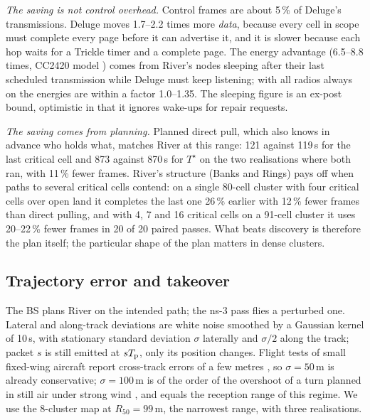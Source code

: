 \emph{The saving is not control overhead.} Control frames are about 5\,\% of Deluge's transmissions. Deluge moves
1.7--2.2 times more \emph{data}, because every cell in scope must complete every page before it can advertise it, and it
is slower because each hop waits for a Trickle timer and a complete page. The energy advantage (6.5--8.8 times, CC2420
model ) comes from River's nodes sleeping after their last scheduled transmission while Deluge
must keep listening; with all radios always on the energies are within a factor 1.0--1.35. The sleeping figure is an
ex-post bound, optimistic in that it ignores wake-ups for repair requests.

\emph{The saving comes from planning.} Planned direct pull, which also knows in advance who holds what, matches River at
this range: 121 against 119\,s for the last critical cell and 873 against 870\,s for $T^\star$ on the two realisations
where both ran, with 11\,\% fewer frames. River's structure (Banks and Rings) pays off when paths to several critical
cells contend: on a single 80-cell cluster with four critical cells over open land it completes the last one 26\,\%
earlier with 12\,\% fewer frames than direct pulling, and with 4, 7 and 16 critical cells on a 91-cell cluster it uses
20--22\,\% fewer frames in 20 of 20 paired passes. What beats discovery is therefore the plan itself; the particular
shape of the plan matters in dense clusters.

\subsection{Trajectory error and takeover}\label{sec:wind}
The BS plans River on the intended path; the ns-3 pass flies a perturbed one. Lateral and along-track deviations are
white noise smoothed by a Gaussian kernel of 10\,s, with stationary standard deviation $\sigma$ laterally and $\sigma/2$
along the track; packet $s$ is still emitted at $sT_{\mathrm p}$, only its position changes. Flight tests of small fixed-wing
aircraft report cross-track errors of a few metres \cite{park2007,nelson2007}, so $\sigma=50$\,m is already
conservative; $\sigma=100$\,m is of the order of the overshoot of a turn planned in still air under strong wind
\cite{techy2009}, and equals the reception range of this regime. We use the 8-cluster map at $R_{50}=99$\,m, the
narrowest range, with three realisations.

